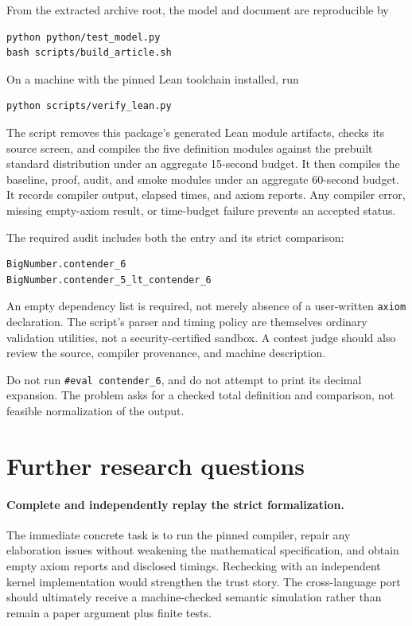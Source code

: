 \documentclass[11pt]{article}
\theoremstyle{definition}
\newcommand{\code}[1]{\texttt{#1}}
\begin{document}
From the extracted archive root, the model and document are reproducible by
\begin{lstlisting}
python python/test_model.py
bash scripts/build_article.sh
\end{lstlisting}
On a machine with the pinned Lean toolchain installed, run
\begin{lstlisting}
python scripts/verify_lean.py
\end{lstlisting}
The script removes this package's generated Lean module artifacts, checks
its source screen, and compiles the five definition modules against the
prebuilt standard distribution under an aggregate 15-second budget. It then
compiles the baseline, proof, audit, and smoke modules under an aggregate
60-second budget. It records compiler output, elapsed times, and axiom
reports. Any compiler error, missing empty-axiom result, or time-budget
failure prevents an accepted status.

The required audit includes both the entry and its strict comparison:
\begin{lstlisting}
BigNumber.contender_6
BigNumber.contender_5_lt_contender_6
\end{lstlisting}
An empty dependency list is
required, not merely absence of a user-written \code{axiom} declaration.
The script's parser and timing policy are themselves ordinary validation
utilities, not a security-certified sandbox. A contest judge should also
review the source, compiler provenance, and machine description.

Do not run \code{\#eval contender\_6}, and do not attempt to print its decimal
expansion. The problem asks for a checked total definition and comparison,
not feasible normalization of the output.

\section{Further research questions}
\label{sec:future}

\paragraph{Complete and independently replay the strict formalization.}
The immediate concrete task is to run the pinned compiler, repair any
elaboration issues without weakening the mathematical specification, and
obtain empty axiom reports and disclosed timings. Rechecking with an
independent kernel implementation would strengthen the trust story. The
cross-language port should ultimately receive a machine-checked semantic
simulation rather than remain a paper argument plus finite tests.
\end{document}
